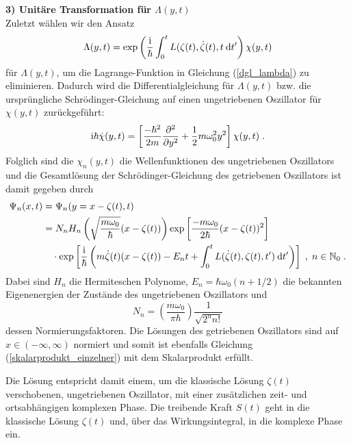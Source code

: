       \textbf{3) Unitäre Transformation für $\Lambda(y,t)$}\\
      Zuletzt wählen wir den Ansatz
      \begin{equation}
        \Lambda(y,t) = \exp\left(\frac{\text i}{\hbar}\int_0^tL(\zeta(t),\dot \zeta(t), t \: \text d t'\right)\chi(y,t)
      \end{equation}
      für $\Lambda(y,t)$, um die Lagrange-Funktion in Gleichung (\ref{dgl_lambda}) zu eliminieren.
      Dadurch wird die Differentialgleichung für $\Lambda(y,t)$ bzw. die ursprüngliche Schrödinger-Gleichung auf einen ungetriebenen Oszillator für $\chi(y,t)$ zurückgeführt:
      \begin{equation}
        \text i \hbar \dot \chi(y,t) = \left[ \frac{-\hbar^2}{2m}\frac{\partial^2}{\partial y^2} + \frac{1}{2}m\omega_0^2y^2 \right]\chi(y,t) \; .
      \end{equation}
      Folglich sind die $\chi_n(y,t)$ die Wellenfunktionen des ungetriebenen Oszillators und die Gesamtlösung der Schrödinger-Gleichung des getriebenen Oszillators ist damit gegeben durch
      \begin{align}
        \Psi_n(x,t) &= \Psi_n(y=x-\zeta(t),t) \notag\\
        &= N_nH_n\left(\sqrt{\frac{m\omega_0}{\hbar}}(x-\zeta(t))\right) \exp\left[\frac{-m\omega_0}{2\hbar}(x-\zeta(t))^2\right] \notag\\
        &\quad \cdot \exp\left[\frac{\text i}{\hbar}\left(m\dot \zeta(t)(x-\zeta(t))-E_nt+\int_0^tL(\dot \zeta(t),\zeta(t),t')\:\text dt'\right)\right] \; ,
        \; n \in \mathbb{N}_0 \; .
        \label{gesamtlsg_einzelner}
      \end{align}
      Dabei sind $H_n$ die Hermiteschen Polynome, $E_n = \hbar \omega_0(n+1/2)$ die bekannten Eigenenergien der Zustände des ungetriebenen Oszillators und
      \begin{equation}
        N_n = \left(\frac{m\omega_0}{\pi \hbar}\right) \frac{1}{\sqrt{2^nn!}}
      \end{equation}
      dessen Normierungsfaktoren.
      Die Lösungen des getriebenen Oszillators sind auf $x \in (-\infty, \infty)$ normiert und somit ist ebenfalls Gleichung (\ref{skalarprodukt_einzelner}) mit dem Skalarprodukt erfüllt.

      Die Lösung entspricht damit einem, um die klassische Lösung $\zeta(t)$ verschobenen, ungetriebenen Oszillator, mit einer zusätzlichen zeit- und ortsabhängigen komplexen Phase.
      Die treibende Kraft $S(t)$ geht in die klassische Lösung $\zeta(t)$ und, über das Wirkungsintegral, in die komplexe Phase ein.



